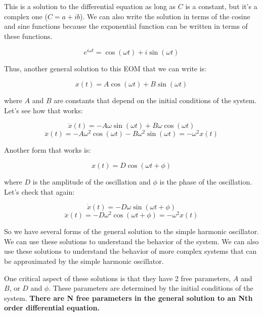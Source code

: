 \documentclass[11pt]{article}
\begin{document}
This is a solution to the differential equation as long as \(C\) is a
constant, but it's a complex one (\(C=a+ib\)). We can also write the
solution in terms of the cosine and sine functions because the
exponential function can be written in terms of these functions.

\[e^{i\omega t} = \cos(\omega t) + i\sin(\omega t)\]

Thus, another general solution to this EOM that we can write is:

\[x(t) = A \cos(\omega t) + B \sin(\omega t)\]

where \(A\) and \(B\) are constants that depend on the initial
conditions of the system. Let's see how that works:

\[\dot{x}(t) = -A \omega \sin(\omega t) + B \omega \cos(\omega t)\]
\[\ddot{x}(t) = -A \omega^2 \cos(\omega t) - B \omega^2 \sin(\omega t) = -\omega^2 x(t)\]

Another form that works is:

\[x(t) = D \cos(\omega t + \phi)\]

where \(D\) is the amplitude of the oscillation and \(\phi\) is the
phase of the oscillation. Let's check that again:

\[\dot{x}(t) = -D \omega \sin(\omega t + \phi)\]
\[\ddot{x}(t) = -D \omega^2 \cos(\omega t + \phi) = -\omega^2 x(t)\]

So we have several forms of the general solution to the simple harmonic
oscillator. We can use these solutions to understand the behavior of the
system. We can also use these solutions to understand the behavior of
more complex systems that can be approximated by the simple harmonic
oscillator.

One critical aspect of these solutions is that they have 2 free
parameters, \(A\) and \(B\), or \(D\) and \(\phi\). These parameters are
determined by the initial conditions of the system. \textbf{There are N
free parameters in the general solution to an Nth order differential
equation.}

    


    
    
    
\end{document}
